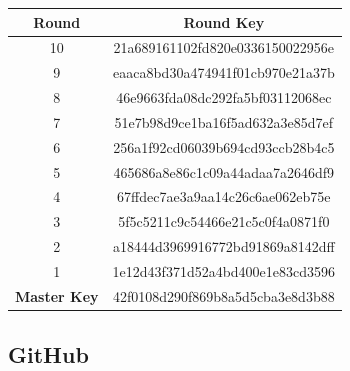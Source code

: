 \documentclass{article}
\begin{document}
\begin{table}[H]
	\begin{tabular}{|c|c|}
		\hline 
		\textbf{Round} & \textbf{Round Key} \\ \hline 
10 & 21a689161102fd820e0336150022956e \\ \hline
9 & eaaca8bd30a474941f01cb970e21a37b \\ \hline
8 & 46e9663fda08dc292fa5bf03112068ec \\ \hline
7 & 51e7b98d9ce1ba16f5ad632a3e85d7ef \\ \hline
6 & 256a1f92cd06039b694cd93ccb28b4c5 \\ \hline
5 & 465686a8e86c1c09a44adaa7a2646df9 \\ \hline
4 & 67ffdec7ae3a9aa14c26c6ae062eb75e \\ \hline
3 & 5f5c5211c9c54466e21c5c0f4a0871f0 \\ \hline
2 & a18444d3969916772bd91869a8142dff \\ \hline 
1 & 1e12d43f371d52a4bd400e1e83cd3596 \\ \hline \hline 
\textbf{Master Key} & 42f0108d290f869b8a5d5cba3e8d3b88 \\ \hline
	\end{tabular}
\end{table}

\subsection{GitHub}


\end{document}
